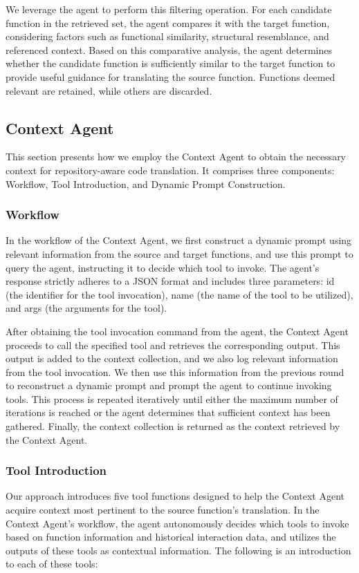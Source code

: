 We leverage the agent to perform this filtering operation. For each candidate function in the retrieved set, the agent compares it with the target function, considering factors such as functional similarity, structural resemblance, and referenced context. Based on this comparative analysis, the agent determines whether the candidate function is sufficiently similar to the target function to provide useful guidance for translating the source function. Functions deemed relevant are retained, while others are discarded.

\subsection{Context Agent}
This section presents how we employ the Context Agent to obtain the necessary context for repository-aware code translation. It comprises three components: Workflow, Tool Introduction, and Dynamic Prompt Construction.

\subsubsection{Workflow}
In the workflow of the Context Agent, we first construct a dynamic prompt using relevant information from the source and target functions, and use this prompt to query the agent, instructing it to decide which tool to invoke. The agent's response strictly adheres to a JSON format and includes three parameters: id (the identifier for the tool invocation), name (the name of the tool to be utilized), and args (the arguments for the tool).

After obtaining the tool invocation command from the agent, the Context Agent proceeds to call the specified tool and retrieves the corresponding output. This output is added to the context collection, and we also log relevant information from the tool invocation. We then use this information from the previous round to reconstruct a dynamic prompt and prompt the agent to continue invoking tools. This process is repeated iteratively until either the maximum number of iterations is reached or the agent determines that sufficient context has been gathered. Finally, the context collection is returned as the context retrieved by the Context Agent.

\subsubsection{Tool Introduction}
Our approach introduces five tool functions designed to help the Context Agent acquire context most pertinent to the source function's translation. In the Context Agent's workflow, the agent autonomously decides which tools to invoke based on function information and historical interaction data, and utilizes the outputs of these tools as contextual information. The following is an introduction to each of these tools:

